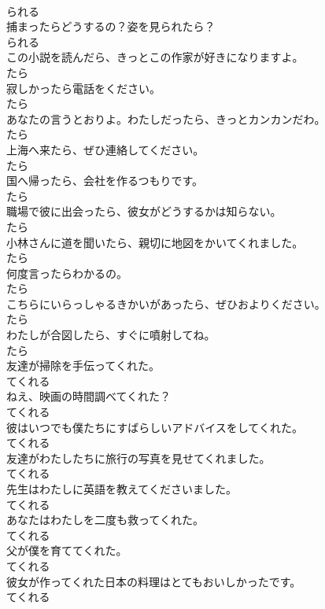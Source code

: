 \documentclass[8pt]{extreport}
\begin{document}
\begin{CJK}{UTF8}{min}
\\	られる
\\	捕まったらどうするの？姿を見られたら？	
\\	られる
\\	この小説を読んだら、きっとこの作家が好きになりますよ。	
\\	たら
\\	寂しかったら電話をください。	
\\	たら
\\	あなたの言うとおりよ。わたしだったら、きっとカンカンだわ。	
\\	たら
\\	上海へ来たら、ぜひ連絡してください。	
\\	たら
\\	国へ帰ったら、会社を作るつもりです。	
\\	たら
\\	職場で彼に出会ったら、彼女がどうするかは知らない。	
\\	たら
\\	小林さんに道を聞いたら、親切に地図をかいてくれました。	
\\	たら
\\	何度言ったらわかるの。	
\\	たら
\\	こちらにいらっしゃるきかいがあったら、ぜひおよりください。	
\\	たら
\\	わたしが合図したら、すぐに噴射してね。	
\\	たら
\\	友達が掃除を手伝ってくれた。	
\\	てくれる
\\	ねえ、映画の時間調べてくれた？	
\\	てくれる
\\	彼はいつでも僕たちにすばらしいアドバイスをしてくれた。	
\\	てくれる
\\	友達がわたしたちに旅行の写真を見せてくれました。	
\\	てくれる
\\	先生はわたしに英語を教えてくださいました。	
\\	てくれる
\\	あなたはわたしを二度も救ってくれた。	
\\	てくれる
\\	父が僕を育ててくれた。	
\\	てくれる
\\	彼女が作ってくれた日本の料理はとてもおいしかったです。	
\\	てくれる

\end{CJK}
\end{document}
